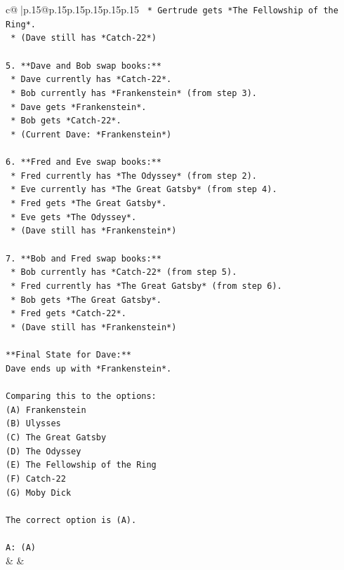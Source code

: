 \documentclass{article}
\begin{document}
{\begin{supertabular}{c@{$\;$}|p{.15\linewidth}@{}p{.15\linewidth}p{.15\linewidth}p{.15\linewidth}p{.15\linewidth}p{.15\linewidth}}
{{{\texttt{    *   Gertrude gets *The Fellowship of the Ring*.} \\
\texttt{    *   (Dave still has *Catch{-}22*)} \\
\\ 
\texttt{5.  **Dave and Bob swap books:**} \\
\texttt{    *   Dave currently has *Catch{-}22*.} \\
\texttt{    *   Bob currently has *Frankenstein* (from step 3).} \\
\texttt{    *   Dave gets *Frankenstein*.} \\
\texttt{    *   Bob gets *Catch{-}22*.} \\
\texttt{    *   (Current Dave: *Frankenstein*)} \\
\\ 
\texttt{6.  **Fred and Eve swap books:**} \\
\texttt{    *   Fred currently has *The Odyssey* (from step 2).} \\
\texttt{    *   Eve currently has *The Great Gatsby* (from step 4).} \\
\texttt{    *   Fred gets *The Great Gatsby*.} \\
\texttt{    *   Eve gets *The Odyssey*.} \\
\texttt{    *   (Dave still has *Frankenstein*)} \\
\\ 
\texttt{7.  **Bob and Fred swap books:**} \\
\texttt{    *   Bob currently has *Catch{-}22* (from step 5).} \\
\texttt{    *   Fred currently has *The Great Gatsby* (from step 6).} \\
\texttt{    *   Bob gets *The Great Gatsby*.} \\
\texttt{    *   Fred gets *Catch{-}22*.} \\
\texttt{    *   (Dave still has *Frankenstein*)} \\
\\ 
\texttt{**Final State for Dave:**} \\
\texttt{Dave ends up with *Frankenstein*.} \\
\\ 
\texttt{Comparing this to the options:} \\
\texttt{(A) Frankenstein} \\
\texttt{(B) Ulysses} \\
\texttt{(C) The Great Gatsby} \\
\texttt{(D) The Odyssey} \\
\texttt{(E) The Fellowship of the Ring} \\
\texttt{(F) Catch{-}22} \\
\texttt{(G) Moby Dick} \\
\\ 
\texttt{The correct option is (A).} \\
\\ 
\texttt{A: (A)} \\
            }
        }
    }
    & & \\ \\


\end{supertabular}}
\end{document}
